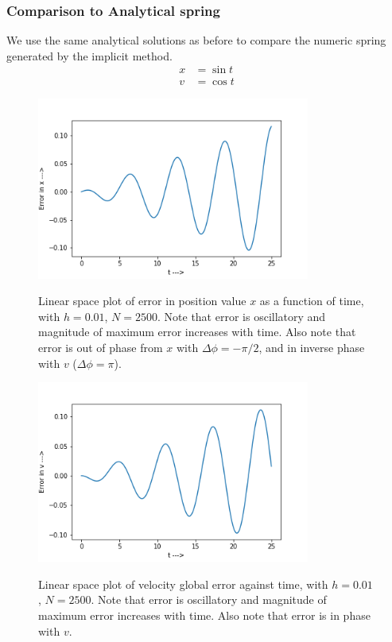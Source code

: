 \documentclass{report}
\begin{document}
\subsubsection*{Comparison to Analytical spring}
We use the same analytical solutions as before to compare the numeric spring generated by the implicit method.
\begin{align*}
x &= \sin t\\
v &= \cos t
\end{align*}
\begin{figure}[H]
	\centering
	\includegraphics[width = 0.8\textwidth]{eXi.png}
	\label{eXi}
	\caption{Linear space plot of error in position value $x$ as a function of time, with $h=0.01$, $N=2500$. Note that error is oscillatory and magnitude of maximum error increases with time. Also note that error is out of phase from $x$ with $\Delta\phi =- \pi/2$, and in inverse phase with $v$ ($\Delta\phi = \pi$).}
\end{figure}
\begin{figure}[H]
	\centering
	\includegraphics[width = 0.8\textwidth]{eVi.png}
	\label{eVi}
	\caption{Linear space plot of velocity global error against time, with $h=0.01$, $N=2500$. Note that error is oscillatory and magnitude of maximum error increases with time. Also note that error is in phase with $v$.}
\end{figure}
\end{document}
